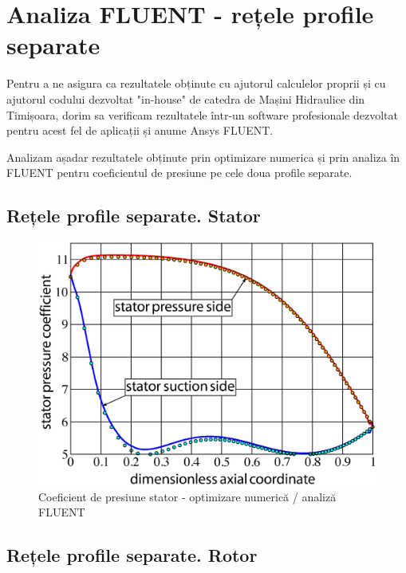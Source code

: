 \chapter{Analiza FLUENT - rețele profile separate}\label{chapter:analiza}

Pentru a ne asigura ca rezultatele obținute cu ajutorul calculelor proprii și cu ajutorul codului dezvoltat "in-house" de catedra de Mașini Hidraulice din Timișoara, dorim sa verificam rezultatele într-un software profesionale dezvoltat pentru acest fel de aplicații și anume Ansys FLUENT.

Analizam așadar rezultatele obținute prin optimizare numerica și prin analiza în FLUENT pentru coeficientul de presiune pe cele doua profile separate.

\section{Rețele profile separate. Stator}

\begin{figure}[h]
	\centering
	\includegraphics[scale=0.5]{figures/cp-stator-ezdraw.eps}
	\caption{Coeficient de presiune stator - optimizare numerică / analiză FLUENT}
	\label{Coeficient de presiune stator - optimizare numerică / analiză FLUENT}
\end{figure}

\clearpage



\section{Rețele profile separate. Rotor}

